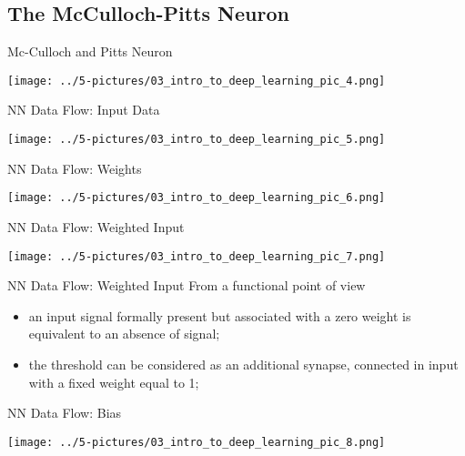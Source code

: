 \documentclass[11pt]{beamer}
\begin{document}
\subsection{The McCulloch-Pitts Neuron}
\begin{frame}{Mc-Culloch and Pitts Neuron}
	\begin{center}
	\texttt{[image: ../5-pictures/03\_intro\_to\_deep\_learning\_pic\_4.png]}
	\end{center}
\end{frame}
\begin{frame}{NN Data Flow: Input Data}
	\begin{center}
	\texttt{[image: ../5-pictures/03\_intro\_to\_deep\_learning\_pic\_5.png]}
	\end{center}
\end{frame}
\begin{frame}{NN Data Flow: Weights}
	\begin{center}
	\texttt{[image: ../5-pictures/03\_intro\_to\_deep\_learning\_pic\_6.png]}
	\end{center}
\end{frame}
\begin{frame}{NN Data Flow: Weighted Input}
	\begin{center}
	\texttt{[image: ../5-pictures/03\_intro\_to\_deep\_learning\_pic\_7.png]}
	\end{center}
\end{frame}
\begin{frame}{NN Data Flow: Weighted Input}
From a functional point of view
	\begin{itemize}
		\item an input signal formally present but associated with a zero weight is equivalent to an absence of signal;
		\item the threshold can be considered as an additional synapse, connected in input with a fixed weight equal to 1;
	\end{itemize}
\end{frame}
\begin{frame}{NN Data Flow: Bias}
	\begin{center}
	\texttt{[image: ../5-pictures/03\_intro\_to\_deep\_learning\_pic\_8.png]}
	\end{center}
\end{frame}
\end{document}
